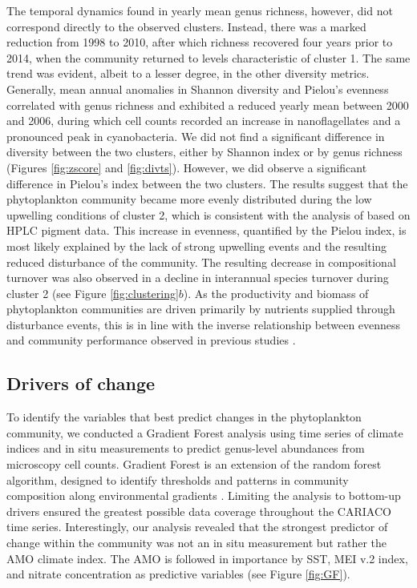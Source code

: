 \documentclass[draft]{agujournal2019}
\begin{document}
    
    The temporal dynamics found in yearly mean genus richness, however, did not correspond directly to the observed clusters. Instead, there was a marked reduction from 1998 to 2010, after which richness recovered four years prior to 2014, when the community returned to levels characteristic of cluster 1. The same trend was evident, albeit to a lesser degree, in the other diversity metrics. Generally, mean annual anomalies in Shannon diversity and Pielou's evenness correlated with genus richness and exhibited a reduced yearly mean between 2000 and 2006, during which cell counts recorded an increase in nanoflagellates and a pronounced peak in cyanobacteria.
    We did not find a significant difference in diversity between the two clusters, either by Shannon index or by genus richness (Figures \ref{fig:zscore} and \ref{fig:divts}). However, we did observe a significant difference in Pielou's index between the two clusters. The results suggest that the phytoplankton community became more evenly distributed during the low upwelling conditions of cluster 2, which is consistent with the analysis of \citeauthor{pinckney_phytoplankton_2015} based on HPLC pigment data. This increase in evenness, quantified by the Pielou index, is most likely explained by the lack of strong upwelling events and the resulting reduced disturbance of the community. The resulting decrease in compositional turnover was also observed in a decline in interannual species turnover during cluster 2 (see Figure \ref{fig:clustering}$b$). As the productivity and biomass of phytoplankton communities are driven primarily by nutrients supplied through disturbance events, this is in line with the inverse relationship between evenness and community performance observed in previous studies \cite{lehtinen_phytoplankton_2017, otero_phytoplankton_2020}.
    
    

\subsection{Drivers of change}
    To identify the variables that best predict changes in the phytoplankton community, we conducted a Gradient Forest analysis using time series of climate indices and in situ measurements to predict genus-level abundances from microscopy cell counts. Gradient Forest is an extension of the random forest algorithm, designed to identify thresholds and patterns in community composition along environmental gradients \cite{ellis_gradient_2012}. Limiting the analysis to bottom-up drivers ensured the greatest possible data coverage throughout the CARIACO time series. Interestingly, our analysis revealed that the strongest predictor of change within the community was not an in situ measurement but rather the AMO climate index. The AMO is followed in importance by SST, MEI v.2 index, and nitrate concentration as predictive variables (see Figure \ref{fig:GF}).
    
\end{document}
